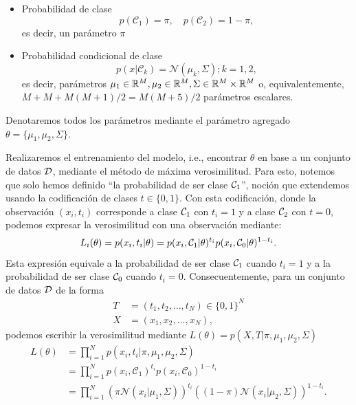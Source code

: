 \begin{itemize}
	\item Probabilidad de clase
	\begin{equation}
	 	p(\mathcal{C}_1)=\pi,\quad  p(\mathcal{C}_2)=1-\pi,\label{eq:prob_clase}
	 \end{equation}  es decir,  un parámetro $\pi$
	\item Probabilidad condicional de clase 
	\begin{equation}
		p(x|\mathcal{C}_k) = \mathcal{N}(\mu_k,  \Sigma); k=1,2,\label{eq:prob_clase_cond}
	\end{equation} 
	es decir, parámetros $ \mu_1\in{\mathbb R}^M,\mu_2\in{\mathbb R}^M,\Sigma\in{\mathbb R}^M\times{\mathbb R}^M$ o, equivalentemente, $M + M + M(M+1)/2=M(M+5)/2$ parámetros escalares. 
\end{itemize}
Denotaremos todos los parámetros mediante el parámetro agregado $\theta =\{\mu_1,\mu_2,\Sigma \}$.

Realizaremos el entrenamiento del modelo, i.e., encontrar $\theta$ en base a un conjunto de datos ${\mathcal D}$, mediante el método de máxima verosimilitud. Para esto, notemos que solo hemos definido ``la probabilidad de ser clase ${\mathcal C}_1$'', noción que extendemos usando la codificación de clases $t\in\{0,1\}$.  Con esta codificación, donde la observación $(x_i,t_i)$ corresponde a clase ${\mathcal C}_1$ con $t_i = 1$ y a clase ${\mathcal C}_2$ con  $t=0$, podemos expresar la verosimilitud con una observación mediante:
\begin{equation}
	L_i(\theta) = p(x_i, t_i|\theta) =  p(x_i,{\mathcal C}_1|\theta)^{t_i}p(x_i,{\mathcal C}_0|\theta)^{1-t_i}. 
\end{equation}
Esta expresión equivale a la probabilidad de ser clase ${\mathcal C}_1$ cuando $t_i=1$ y a la probabilidad de ser clase ${\mathcal C}_0$ cuando $t_i=0$. Consecuentemente, para un conjunto de datos ${\mathcal D}$ de la forma
	\begin{align}
	T&=(t_1,t_2,\ldots,t_N) \in \{0,1\}^N\\
	X&=(x_1,x_2,\ldots,x_N),
	\end{align}
podemos escribir la verosimilitud mediante $L(\theta) = p(X,T|\pi,\mu_1,\mu_2,\Sigma) $
\begin{align}
	L(\theta) &= \prod_{i=1}^{N}p(x_i,t_i|\pi,\mu_1,\mu_2,\Sigma)\nonumber\\
	&= \prod_{i=1}^{N}p(x_i,\mathcal{C}_1)^{t_i}p(x_i,\mathcal{C}_0)^{1-t_i}\nonumber\\
	&= \prod_{i=1}^{N}(\pi\mathcal{N}(x_i|\mu_1,\Sigma))^{t_i}
	((1-\pi)\mathcal{N}(x_i|\mu_2,\Sigma))^{1-t_i}.
	\end{align}


